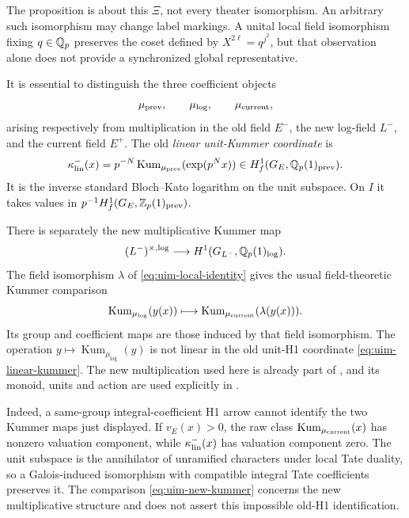 The proposition is about this \(\Xi\), not every
theater isomorphism. An arbitrary such isomorphism
may change label markings. A unital local field
isomorphism fixing \(q\in\mathbb Q_p\) preserves the coset
defined by \(X^{2\ell}=q^{j^2}\), but that observation
alone does not provide a synchronized global
representative.

It is essential to distinguish the three coefficient
objects
\[
 \mu_{\rm prev},\qquad \mu_{\log},\qquad
 \mu_{\rm current},
\]
arising respectively from multiplication in the
old field \(E^-\), the new log-field \(L^-\), and
the current field \(E^+\).
The old \emph{linear unit-Kummer coordinate} is
\begin{equation}\label{eq:uim-linear-kummer}
 \kappa^-_{\rm lin}(x)
   =p^{-N}\operatorname{Kum}_{\mu_{\rm prev}}
                   (\exp(p^Nx))
       \in H^1_f(G_E,\mathbb Q_p(1)_{\rm prev}).
\end{equation}
It is the inverse standard Bloch--Kato logarithm
on the unit subspace. On \(I\) it takes values in
\(p^{-1}H^1_f(G_E,\mathbb Z_p(1)_{\rm prev})\).

There is separately the new multiplicative Kummer map
\[
 (L^-)^{\times,\log}\longrightarrow
       H^1(G_{L^-},\mathbb Q_p(1)_{\log}).
\]
The field isomorphism \(\lambda\) of
\eqref{eq:uim-local-identity} gives the usual
field-theoretic Kummer comparison
\begin{equation}\label{eq:uim-new-kummer}
 \operatorname{Kum}_{\mu_{\log}}(y(x))
       \longmapsto
 \operatorname{Kum}_{\mu_{\rm current}}(\lambda(y(x))).
\end{equation}
Its group and coefficient maps are those induced by
that field isomorphism. The operation
\(y\mapsto\operatorname{Kum}_{\mu_{\log}}(y)\)
is not linear in the old unit-H1 coordinate
\eqref{eq:uim-linear-kummer}.
The new multiplication used here is already part
of \cite[Definition~1.1(i), p.~24]{IUT3}, and its
monoid, units and action are used explicitly in
\cite[Proposition~3.4(i), p.~102]{IUT3}.

Indeed, a same-group integral-coefficient H1 arrow
cannot identify the two Kummer maps just displayed.
If \(v_E(x)>0\), the raw class
\(\operatorname{Kum}_{\mu_{\rm current}}(x)\) has
nonzero valuation component, while
\(\kappa^-_{\rm lin}(x)\) has valuation component
zero. The unit subspace is the annihilator of
unramified characters under local Tate duality,
so a Galois-induced isomorphism with compatible
integral Tate coefficients preserves it.
The comparison \eqref{eq:uim-new-kummer} concerns
the new multiplicative structure and does not
assert this impossible old-H1 identification.

